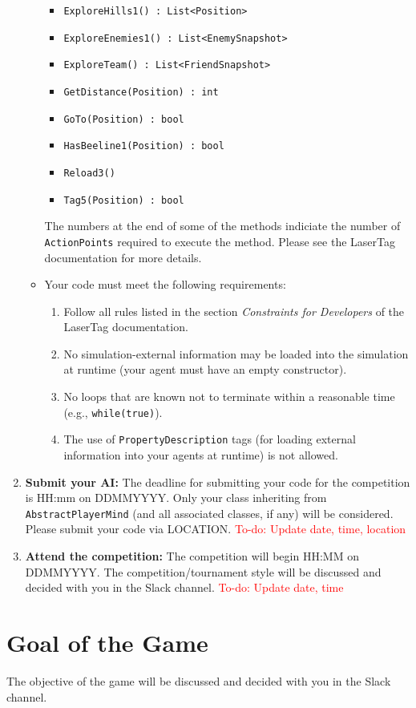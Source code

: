 \documentclass[
    a4paper,
    english,
    DIV=16,
    11pt,
    parskip=half,
]{scrartcl}
\newcommand\todo[1]{\textcolor{red}{#1}}
\begin{document}
\begin{enumerate}
\begin{itemize}
\begin{itemize}
      \item \texttt{ExploreHills1() : List<Position>}
      \item \texttt{ExploreEnemies1() : List<EnemySnapshot>}
      \item \texttt{ExploreTeam() : List<FriendSnapshot>}
      \item \texttt{GetDistance(Position) : int}
      \item \texttt{GoTo(Position) : bool}
      \item \texttt{HasBeeline1(Position) : bool}
      \item \texttt{Reload3()}
      \item \texttt{Tag5(Position) : bool}
    \end{itemize}
    The numbers at the end of some of the methods indiciate the number of \texttt{ActionPoints} required to execute the method. Please see the LaserTag documentation for more details.
    \item Your code must meet the following requirements:
    \begin{enumerate}
      \item Follow all rules listed in the section \emph{Constraints for Developers} of the LaserTag documentation.
      \item No simulation-external information may be loaded into the simulation at runtime (your agent must have an empty constructor).
      \item No loops that are known not to terminate within a reasonable time (e.g., \texttt{while(true)}).
      \item The use of \texttt{PropertyDescription} tags (for loading external information into your agents at runtime) is not allowed.
    \end{enumerate}
  \end{itemize}
  \item \textbf{Submit your AI:} The deadline for submitting your code for the competition is HH:mm on DDMMYYYY. Only your class inheriting from \texttt{AbstractPlayerMind} (and all associated classes, if any) will be considered. Please submit your code via LOCATION. \todo{To-do: Update date, time, location}
  \item \textbf{Attend the competition:} The competition will begin HH:MM on DDMMYYYY. The competition/tournament style will be discussed and decided with you in the Slack channel. \todo{To-do: Update date, time}
\end{enumerate}

\section*{Goal of the Game}
The objective of the game will be discussed and decided with you in the Slack channel.
\end{document}
